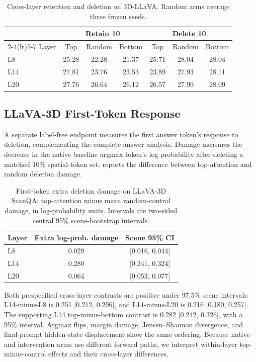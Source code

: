 \begin{table}[t]
\centering
\caption{Cross-layer retention and deletion on 3D-LLaVA. Random arms average three frozen seeds.}
\label{tab:supp_stage}
\begin{tabular}{lcccccc}
\toprule
& \multicolumn{3}{c}{Retain 10} & \multicolumn{3}{c}{Delete 10} \\
\cmidrule(lr){2-4}\cmidrule(lr){5-7}
Layer & Top & Random & Bottom & Top & Random & Bottom \\
\midrule
L8 & 25.28 & 22.28 & 21.37 & 25.71 & 28.04 & 28.04 \\
L14 & 27.81 & 23.76 & 23.53 & 23.89 & 27.93 & 28.11 \\
L20 & 27.76 & 26.64 & 26.12 & 26.57 & 27.99 & 28.09 \\
\bottomrule
\end{tabular}
\end{table}

\subsection{LLaVA-3D First-Token Response}
A separate label-free endpoint measures the first answer token's response to deletion, complementing the complete-answer analysis. Damage measures the decrease in the native baseline argmax token's log probability after deleting a matched 10\% spatial-token set.  reports the difference between top-attention and random deletion damage.

\begin{table}[t]
\centering
\caption{First-token extra deletion damage on LLaVA-3D ScanQA: top-attention minus mean random-control damage, in log-probability units. Intervals are two-sided central 95\% scene-bootstrap intervals.}
\label{tab:supp_firsttoken}
\begin{tabular}{lcc}
\toprule
Layer & Extra log-prob. damage & Scene 95\% CI \\
\midrule
L8 & 0.029 & [0.016, 0.044] \\
L14 & 0.280 & [0.241, 0.324] \\
L20 & 0.064 & [0.053, 0.077] \\
\bottomrule
\end{tabular}
\end{table}

Both prespecified cross-layer contrasts are positive under 97.5\% scene intervals: L14-minus-L8 is 0.251 [0.212, 0.296], and L14-minus-L20 is 0.216 [0.180, 0.257]. The supporting L14 top-minus-bottom contrast is 0.282 [0.242, 0.326], with a 95\% interval. Argmax flips, margin damage, Jensen--Shannon divergence, and final-prompt hidden-state displacement show the same ordering. Because native and intervention arms use different forward paths, we interpret within-layer top-minus-control effects and their cross-layer differences.

